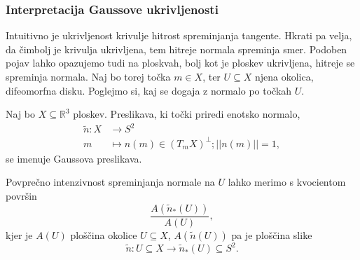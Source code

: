 \subsubsection{Interpretacija Gaussove ukrivljenosti}

Intuitivno je ukrivljenost krivulje hitrost spreminjanja tangente. Hkrati pa velja, da čimbolj je krivulja ukrivljena, tem hitreje
normala spreminja smer. Podoben pojav lahko opazujemo tudi na ploskvah, bolj kot je ploskev ukrivljena, hitreje se spreminja normala.
Naj bo torej točka $m \in  X$, ter $U \subseteq X$ njena okolica, difeomorfna disku. Poglejmo si, kaj se dogaja z normalo po točkah $U$.

\begin{definicija}
\label{def_gaussova_preslikava}
Naj bo $X \subseteq  \mathbb{R}^3$ ploskev. Preslikava, ki točki priredi enotsko normalo, \begin{align*}
  \tilde{n}: X &\longrightarrow S^{2} \\
  m &\longmapsto n(m) \in  (T_mX)^{\perp}; \lvert\lvert n(m) \rvert\rvert = 1,   
\end{align*}se imenuje Gaussova preslikava.
\end{definicija}

Povprečno intenzivnost spreminjanja normale na $U$ lahko merimo s kvocientom površin \begin{equation*}
\frac{A(\tilde{n}_{*}(U))}{A(U)},
\end{equation*}  
kjer je $A(U)$ ploščina okolice $U \subseteq X$, $A(\tilde{n}(U))$ pa je ploščina slike \begin{equation*}
\tilde{n}: U \subseteq X \to \tilde{n}_{*}(U) \subseteq S^2. 
\end{equation*} 

